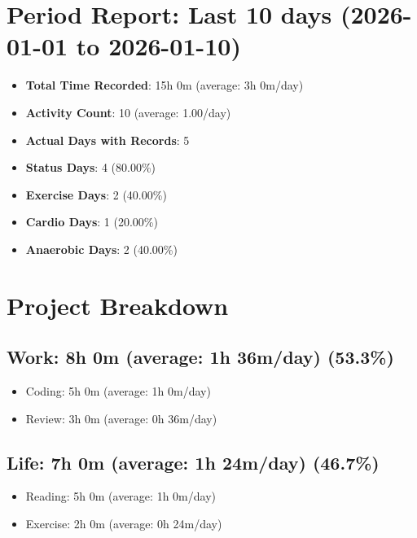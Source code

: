 \documentclass[12pt]{extarticle}
\begin{document}
{\fontsize{18}{21.6}\selectfont\section*{Period Report: Last 10 days (2026-01-01 to 2026-01-10)}}

\begin{itemize}[topsep=0pt, itemsep=-0.5ex]
    \item \textbf{Total Time Recorded}: 15h 0m (average: 3h 0m/day)
    \item \textbf{Activity Count}: 10 (average: 1.00/day)
    \item \textbf{Actual Days with Records}: 5
    \item \textbf{Status Days}: 4 (80.00\%)
    \item \textbf{Exercise Days}: 2 (40.00\%)
    \item \textbf{Cardio Days}: 1 (20.00\%)
    \item \textbf{Anaerobic Days}: 2 (40.00\%)
\end{itemize}

{\fontsize{16}{19.2}\selectfont\section*{Project Breakdown}}

{\fontsize{16}{19.2}\selectfont\subsection*{Work: 8h 0m (average: 1h 36m/day) (53.3\%)}}
\begin{itemize}[topsep=0pt, itemsep=-0.5ex]
    \item Coding: 5h 0m (average: 1h 0m/day)
    \item Review: 3h 0m (average: 0h 36m/day)
\end{itemize}
{\fontsize{16}{19.2}\selectfont\subsection*{Life: 7h 0m (average: 1h 24m/day) (46.7\%)}}
\begin{itemize}[topsep=0pt, itemsep=-0.5ex]
    \item Reading: 5h 0m (average: 1h 0m/day)
    \item Exercise: 2h 0m (average: 0h 24m/day)
\end{itemize}
\end{document}
